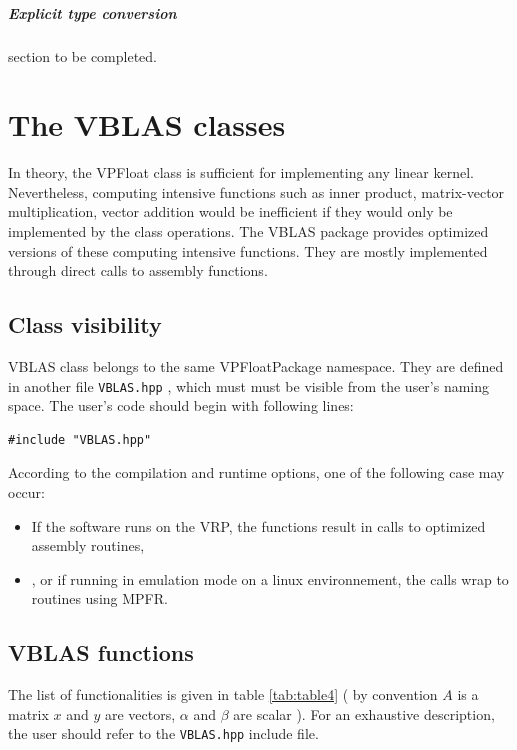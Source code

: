 \documentclass[11pt]{report}
\begin{document}
\paragraph{Explicit type conversion}
section to be completed.

\chapter{The VBLAS classes}

In theory, the VPFloat class is sufficient for implementing any linear kernel.
Nevertheless, computing intensive functions such as inner product, matrix-vector multiplication, vector addition would be
inefficient if they would only be implemented by the class operations.
The VBLAS package provides optimized versions of these computing intensive functions. They are mostly implemented through direct calls to 
assembly functions.
\section{Class visibility}
VBLAS class belongs to the same VPFloatPackage namespace. They are defined in another file \texttt{VBLAS.hpp} , which must must be visible from the user's naming space. The user's code should begin with following lines:
\begin{verbatim}
#include "VBLAS.hpp"
\end{verbatim}
According to the compilation and runtime options, one of the following case may occur:
\begin{itemize}
\item If the software runs on the VRP, the functions result in calls to optimized assembly routines,
  \item , or if running in emulation mode on a linux environnement, the calls wrap to routines using MPFR.
\end{itemize}

\section{VBLAS functions}

The list of functionalities is given in table \ref{tab:table4} ( by convention $A$ is a matrix $x$ and $y$ are vectors, $\alpha$ and $\beta$ are scalar ).
For an exhaustive description, the user should refer to the \texttt{VBLAS.hpp} include file.\\
\end{document}
